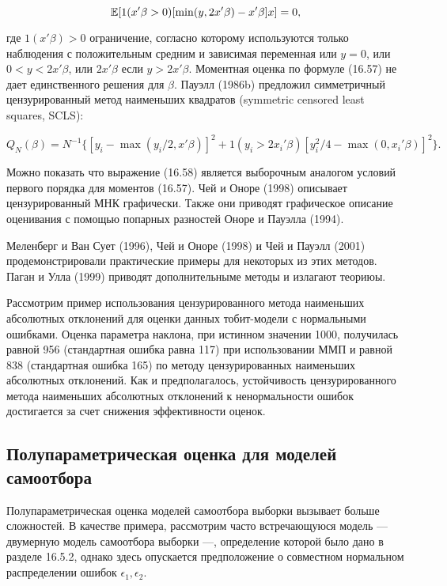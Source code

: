 \begin{equation}
\mathbb{E}[1(x'\beta>0)[\min(y,2x'\beta)-x'\beta]x]=0,
\end{equation}

где $1(x'\beta)>0$ ограничение, согласно которому используются только наблюдения с положительным средним и зависимая переменная или $y=0$, или $0<y<2x'\beta$, или $2x'\beta$ если $y>2x'\beta$. Моментная оценка  по формуле (16.57) не дает единственного решения для $\beta$. Пауэлл (1986b) предложил симметричный цензурированный метод наименьших квадратов (symmetric censored least squares, SCLS):

\begin{equation}
Q_N(\beta)=N^{-1}\lbrace[y_i-\max(y_i/2,x'\beta)]^{2}+1(y_i>2x_i'\beta)[y_i^2/4-\max(0,x_i'\beta)]^2\rbrace.
\end{equation}

Можно показать что выражение (16.58) является выборочным аналогом условий первого порядка для моментов (16.57). Чей и Оноре (1998) описывает цензурированный МНК графически. Также они приводят графическое описание оценивания с помощью попарных разностей  Оноре и Пауэлла (1994). 

Меленберг и Ван Сует (1996), Чей и Оноре (1998) и Чей и Пауэлл (2001) продемонстрировали практические примеры для некоторых из этих методов. Паган и Улла (1999) приводят дополнительныме методы и излагают теориюы.

Рассмотрим пример использования цензурированного метода наименьших абсолютных отклонений для оценки данных тобит-модели с нормальными ошибками. Оценка параметра наклона, при истинном  значении 1000, получилась равной 956 (стандартная ошибка равна 117) при использовании ММП и равной 838 (стандартная ошибка 165) по методу цензурированных наименьших абсолютных отклонений. Как и предполагалось, устойчивость цензурированного метода наименьших абсолютных отклонений к ненормальности ошибок достигается за счет снижения  эффективности оценок.

\subsection{Полупараметрическая оценка для моделей самоотбора}

Полупараметрическая оценка моделей самоотбора выборки вызывает больше сложностей. В качестве примера, рассмотрим часто встречающуюся модель --- двумерную модель самоотбора выборки ---, определение которой было дано в разделе 16.5.2, однако здесь опускается предположение о совместном нормальном распределении ошибок $\epsilon_1,\epsilon_2$.


